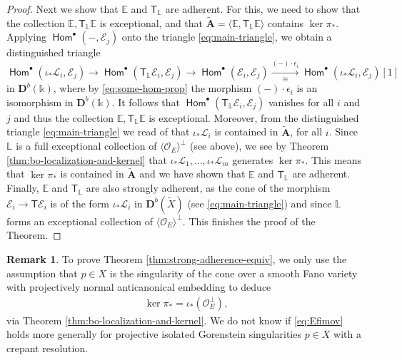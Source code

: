 \documentclass[a4paper,11pt, reqno]{amsart}
\def\E{\mathbb E}
\def\L{\mathbb L}
\def\AA{\mathbf A}
\def\DD{\mathbf D}
\def\OO{\mathcal O}
\def\sE{\mathscr{E}}
\def\sL{\mathscr{L}}
\newcommand{\opname}[1]{\operatorname{\mathsf{#1}}}
\newcommand{\Hom}{\opname{Hom}}
\def\Db{\DD^b}
\newcommand{\bT}{\mathsf{T}}
\theoremstyle{plain}
\theoremstyle{definition}
\newtheorem{remark}[dummy]{Remark}
\numberwithin{equation}{section}
\newlength{\arrow}
\begin{document}
\begin{proof}
    
    Next we show that $\E$ and $\bT_\L$ are adherent.
   For this, we need to show that the collection $\mathbb{E} ,  \bT_{{\L}}   \E $ is exceptional, and that $\tilde{ \AA } = \langle \E , \bT_{\L}  \E  \rangle $ contains $\ker\pi_\ast$.
    Applying $\Hom^\bullet ( - , \sE_j )$ onto the triangle \eqref{eq:main-triangle}, we obtain
    a distinguished triangle 
    \[
    \Hom^\bullet ( \iota_\ast \sL_i , \sE_j ) \to \Hom^\bullet ( \bT_\L \sE_i , \sE_j ) \to \Hom^\bullet ( \sE_i , \sE_j  ) \xrightarrow[\cong]{(-)\cdot \epsilon_i} \Hom^\bullet ( \iota_\ast \sL_i , \sE_j )[1]
    \]
    in $\Db(\mathbb{k})$, where by \eqref{eq:some-hom-prop} the morphism $(-)\cdot \epsilon_i$ is an isomorphism in $\Db(\mathbb{k})$.
    It follows that $\Hom^\bullet  ( \bT_{\L} \sE_i , \sE_j  ) $ vanishes for all $i$ and $j$ and thus the collection $\E , \bT_{\L}  \E $ is exceptional.
    Moreover, from the distinguished triangle \eqref{eq:main-triangle} we read of that $\iota_\ast \sL_i$ is contained in $\tilde{\AA} $, for all $i$.
    Since $\L$ is a full exceptional collection of $\langle \OO_E\rangle^\perp$ (see above), we see by Theorem \ref{thm:bo-localization-and-kernel} that $\iota_\ast \sL_1 , \ldots , \iota_\ast \sL_{m} $ generates $\ker \pi_\ast$.
    This means that $\ker\pi_\ast$ is contained in $\tilde{\AA}$ and we have shown that $\E$ and $\bT_\L$ are adherent.
    Finally, $\E$ and $\bT_\L$ are also strongly adherent, as the cone of the morphism $\sE_i \to \bT\sE_i $ is of the form $\iota_\ast \sL_i$ in $\Db ( \tilde{X} )$ (see \eqref{eq:main-triangle}) and since $\L$ forms an exceptional collection of $\langle \OO_E \rangle^\perp$.
    This finishes the proof of the Theorem.
\end{proof}

\begin{remark}
     To prove Theorem \ref{thm:strong-adherence-equiv}, we only use the assumption that $p \in X$ is the singularity of the cone over a smooth Fano variety with projectively normal anticanonical embedding to deduce
    \begin{align}\label{eq:Efimov}
     \ker\pi_\ast = \iota_\ast ( \OO_E^\perp ),   
    \end{align}
  via Theorem \ref{thm:bo-localization-and-kernel}.
    We do not know if \eqref{eq:Efimov} holds more generally for projective isolated Gorenstein singularities $p\in X$ with a crepant resolution.
\end{remark}
\end{document}
